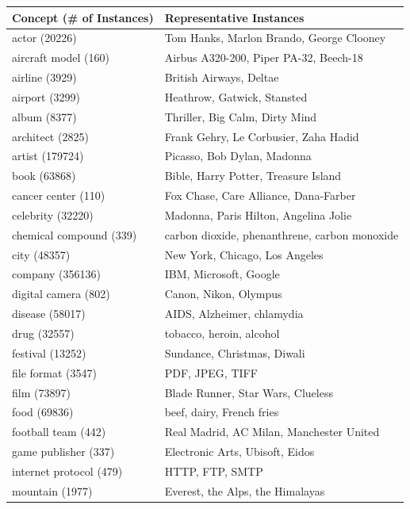 \documentclass[10pt,journal,cspaper,compsoc]{IEEEtran}
\begin{document}
\begin{table}%
\centering
\begin{tabular}{|l|l|}
\hline
{\bf Concept (\# of Instances)} & {\bf Representative Instances} \\
\hline \hline
actor (20226)& Tom Hanks, Marlon Brando, George Clooney\\
\hline
aircraft model	(160) & Airbus A320-200, Piper PA-32, Beech-18\\
\hline
airline (3929) & British Airways, Deltae\\
\hline
airport (3299) & Heathrow, Gatwick, Stansted\\
\hline
album (8377) & Thriller, Big Calm, Dirty Mind \\
\hline
architect (2825) & Frank Gehry, Le Corbusier, Zaha Hadid\\
\hline
artist (179724)	& Picasso, Bob Dylan, Madonna\\
\hline
book (63868) &	Bible,	Harry Potter, Treasure Island\\
\hline
cancer center (110) & Fox Chase, Care Alliance, Dana-Farber\\
\hline
celebrity	(32220) & Madonna, Paris Hilton, Angelina Jolie\\
\hline
chemical compound (339) & carbon dioxide, phenanthrene, carbon monoxide\\
\hline
city (48357) & New York,	Chicago,	Los Angeles\\
\hline
company (356136) &	IBM,	Microsoft,	Google\\
\hline
digital camera (802) &	Canon,	Nikon,	Olympus\\
\hline
disease (58017) & AIDS,	Alzheimer,	chlamydia\\
\hline
drug (32557) & tobacco,	heroin,	alcohol\\
\hline
festival (13252)	& Sundance,	Christmas,	Diwali\\
\hline
file format (3547) & PDF,	JPEG,	TIFF\\
\hline
film (73897) &	Blade Runner,	Star Wars,	Clueless\\
\hline
food (69836) & beef,	dairy,	French fries\\
\hline
football team (442)	& Real Madrid,	AC Milan,	Manchester United\\
\hline
game publisher	(337) & Electronic Arts,	Ubisoft,	Eidos\\
\hline
internet protocol (479) & HTTP,	FTP,	SMTP\\
\hline
mountain (1977) &	Everest,	the Alps,	the Himalayas\\

\end{tabular}
\end{table}
\end{document}
